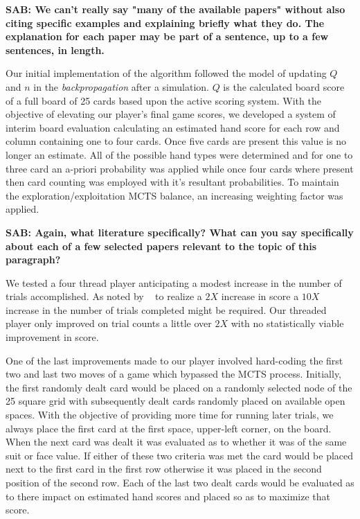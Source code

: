 \documentclass[letterpaper]{article}
\begin{document}
{\bf SAB: We can't really say "many of the available papers" without also citing specific examples and explaining briefly what they do. The explanation for each paper may be part of a sentence, up to a few sentences, in length.}

Our initial implementation of the algorithm followed the model of updating $Q$ and $n$ in the \emph{backpropagation} after a simulation. $Q$ is the calculated board score of a full board of 25 cards based upon the active scoring system. With the objective of elevating our player's final game scores, we developed a system of interim board evaluation calculating an estimated hand score for each row and column containing one to four cards. Once five cards are present this value is no longer an estimate. All of the possible hand types were determined and for one to three card an a-priori probability was applied while once four cards where present then card counting was employed with it's resultant probabilities. To maintain the exploration/exploitation MCTS balance, an increasing weighting factor was applied.

{\bf SAB: Again, what literature specifically? What can you say specifically about each of a few selected papers relevant to the topic of this paragraph?}

We tested a four thread player anticipating a modest increase in the number of trials accomplished. As noted by ~\cite{browne2010monte} to realize a $2X$ increase in score a $10X$ increase in the number of trials completed might be required. Our threaded player only improved on trial counts a little over $2X$ with no statistically viable improvement in score.

One of the last improvements made to our player involved hard-coding the first two and last two moves of a game which bypassed the MCTS process. Initially, the first randomly dealt card would be placed on a randomly selected node of the 25 square grid with subsequently dealt cards randomly placed on available open spaces. With the objective of providing more time for running later trials, we always place the first card at the first space, upper-left corner, on the board. When the next card was dealt it was evaluated as to whether it was of the same suit or face value. If either of these two criteria was met the card would be placed next to the first card in the first row otherwise it was placed in the second position of the second row. Each of the last two dealt cards would be evaluated as to there impact on estimated hand scores and placed so as to maximize that score.
\end{document}
